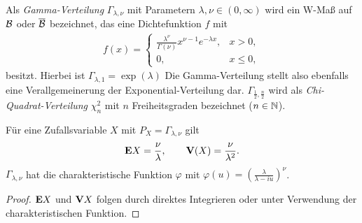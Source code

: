 \begin{bem}
\label{bem:6.6}
Als \emph{Gamma-Verteilung} $\Gamma _{\lambda , \nu }$ mit
Parametern $\lambda , \nu \in (0,\infty )$ wird ein W-Maß auf ${\mathcal{B}}$
oder $\overline{\mathcal{B}}$ bezeichnet, das eine Dichtefunktion $f$ mit
\begin{align*}
f(x) = \begin{cases}
\frac{\lambda ^ {\nu }}{\Gamma (\nu )} x^ {\nu -1}e ^ {-\lambda x},& x>0, \\
0, & x\leq 0,
\end{cases}
\end{align*}
besitzt. Hierbei ist $ \Gamma _{\lambda ,1} = \exp (\lambda)$ Die
Gamma-Verteilung stellt also ebenfalls eine Verallgemeinerung der
Exponential-Verteilung dar. $\Gamma _{\frac{1}{2},\frac{n}{2}}$ wird als
\emph{Chi-Quadrat-Verteilung} $\chi^ {2}_{n}$ mit $n$ Freiheitsgraden
bezeichnet ($n\in\mathbb{N}$).

Für eine Zufallsvariable $X$ mit $P_{X} =\Gamma _{\lambda , \nu }$ gilt
\begin{align*}
\textbf{E} X=\frac{\nu}{\lambda},\qquad \textbf{V}(X) = \frac{\nu }{\lambda ^ {2}}.
\end{align*}
$\Gamma _{\lambda , \nu }$ hat die charakteristische Funktion $\varphi $ mit
$\varphi (u) =  \left( \frac{\lambda}{\lambda -iu}\right) ^ {\nu }$.
\begin{proof}
$\textbf{E} X$ und $\textbf{V} X$ folgen durch direktes Integrieren oder unter Verwendung der
charakteristischen Funktion.


\end{proof}
\end{bem}
